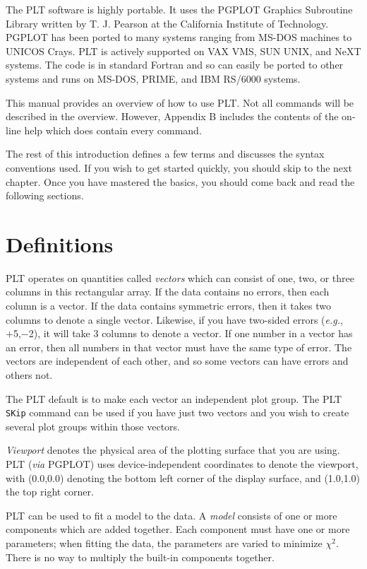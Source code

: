 The PLT software is highly portable.
It uses the PGPLOT Graphics Subroutine Library written by
T. J. Pearson at the California Institute of Technology.
PGPLOT has been ported to many systems ranging from MS-DOS
machines to UNICOS Crays.
PLT is actively supported on VAX VMS, SUN UNIX, and NeXT systems.
The code is in standard Fortran and so can easily be ported to other
systems and runs on MS-DOS, PRIME, and IBM RS/6000 systems.

This manual provides an overview of how to use PLT.
Not all commands will be described in the overview.
However, Appendix B includes the contents of the on-line help which
does contain every command.

The rest of this introduction defines a few terms and discusses
the syntax conventions used.
If you wish to get started quickly, you should skip to the next chapter.
Once you have mastered the basics, you should come back and
read the following sections.

\section{Definitions}

PLT operates on quantities called {\em vectors} which can consist
of one, two, or three columns in this rectangular array.
If the data contains no errors, then each column is a vector.
If the data contains symmetric errors,
then it takes two columns to denote a single vector.
Likewise, if you have two-sided errors ({\it e.g.}, +5,$-$2),
it will take 3 columns to denote a vector.
If one number in a vector has an error,
then all numbers in that vector must have the same type of error.
The vectors are independent of each other,
and so some vectors can have errors and others not.

The PLT default is to make each vector an independent plot group.
The PLT {\tt SKip} command can be used if you have just two vectors
and you wish to create several plot groups within those vectors.

{\em Viewport} denotes the physical area of the plotting surface
that you are using.
PLT ({\it via} PGPLOT) uses device-independent coordinates to denote
the viewport,
with (0.0,0.0) denoting the bottom left corner of the display surface,
and (1.0,1.0) the top right corner.

PLT can be used to fit a model to the data.
A {\it model} consists of one or more components which are added together.
Each component must have one or more parameters;
when fitting the data,
the parameters are varied to minimize $\chi^2$.
There is no way to multiply the built-in components together.

